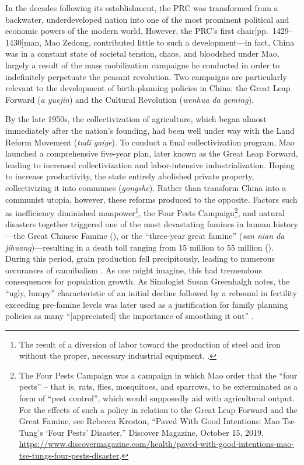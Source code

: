 In the decades following its establishment, the PRC was transformed from a backwater, underdeveloped nation into one of the most prominent political and economic powers of the modern world. However, the PRC’s first chair[pp.\ 1429--1430]man, Mao Zedong, contributed little to such a development---in fact, China was in a constant state of societal tension, chaos, and bloodshed under Mao, largely a result of the mass mobilization campaigns he conducted in order to indefinitely perpetuate the peasant revolution. Two campaigns are particularly relevant to the development of birth-planning policies in China: the Great Leap Forward (\emph{a yuejin}) and the Cultural Revolution (\emph{wenhua da geming}).

By the late 1950s, the collectivization of agriculture, which began almost immediately after the nation’s founding, had been well under way with the Land Reform Movement (\emph{tudi gaige}). To conduct a final collectivization program, Mao launched a comprehensive five-year plan, later known as the Great Leap Forward, leading to increased collectivization and labor-intensive industrialization. Hoping to increase productivity, the state entirely abolished private property, collectivizing it into communes (\emph{gongshe}). Rather than transform China into a communist utopia, however, these reforms produced to the opposite. Factors such as inefficiency \autocite{Britannica2024GreatLeapForward} diminished manpower\footnote{The result of a diversion of labor toward the production of steel and iron without the proper, necessary industrial equipment. \cite{Smil1999GreatFamine}.}, the Four Pests Campaign\footnote{The Four Pests Campaign was a campaign in which Mao order that the “four pests” – that is, rats, flies, mosquitoes, and sparrows, to be exterminated as a form of “pest control”, which would supposedly aid with agricultural output. For the effects of such a policy in relation to the Great Leap Forward and the Great Famine, see Rebecca Kreston, “Paved With Good Intentions: Mao Tse-Tung’s ‘Four Pests’ Disaster,” Discover Magazine, October 15, 2019, \url{https://www.discovermagazine.com/health/paved-with-good-intentions-mao-tse-tungs-four-pests-disaster}.}, and natural disasters together triggered one of the most devastating famines in human history---the Great Chinese Famine (\cites[pp.\ 51--73]{KungLin2003GreatLeapFamine}[pp.\ 125--140]{LinYang1998AgriculturalCrisis}), or the “three-year great famine” (\emph{san nian da jihuang})---resulting in a death toll ranging from 15 million to 55 million (\cites{Remais2023BerkeleyPublicHealth}[pp.\ 13--25]{ChenYixin2015}). During this period, grain production fell precipitously, leading to numerous occurances of cannibalism \autocite{Bernstein1997HiddenChineseFamine}. As one might imagine, this had tremendous consequences for population growth. As Sinologist Susan Greenhalgh notes, the “ugly, lumpy” characteristic of an initial decline followed by a rebound in fertility exceeding pre-famine levels was later used as a justification for family planning policies as many “[appreciated] the importance of smoothing it out” \autocite[pp.\ 113--114]{Greenhalgh2008JustOneChild}.

